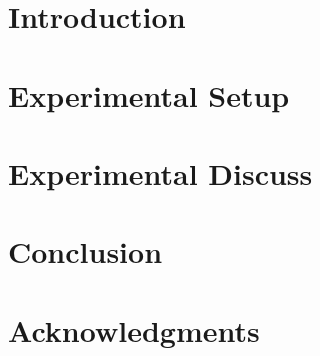 \documentclass{article}
\begin{document}
\section{Introduction}


\section{Experimental Setup}\label{exp}


\section{Experimental Discuss}\label{discuss}


\section{Conclusion}


\section*{Acknowledgments}




\nocite{langley00}



\end{document}
